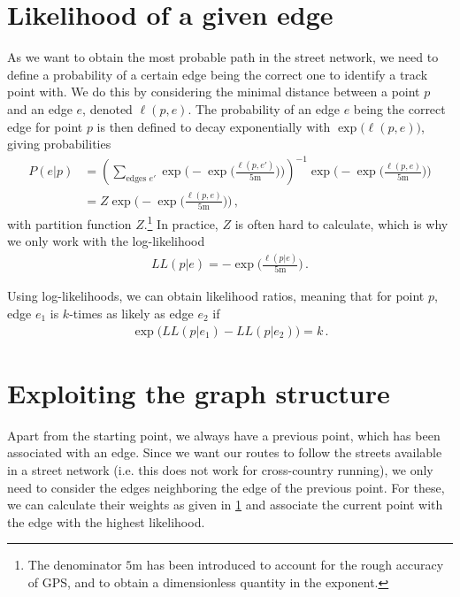 \documentclass[notitlepage]{scrarticle}
\begin{document}
\section{Likelihood of a given edge}\label{sec:likelihood_of_edge}
As we want to obtain the most probable path in the street network, we need to define a probability of a certain edge being the correct one to identify a track point with.
We do this by considering the minimal distance between a point $p$ and an edge $e$, denoted $\ell(p,e)$.
The probability of an edge $e$ being the correct edge for point $p$ is then defined to decay exponentially with $\exp\big(\ell(p,e)\big)$, giving probabilities
%
\begin{align*}
	P(e|p) & = \left(\sum_{\text{edges }e'}\exp\Big(-\exp\big(\frac{\ell(p,e')}{5\unit{\metre}}\big)\Big)\right)^{-1}\exp\Big(-\exp\big(\frac{\ell(p,e)}{5\unit{\metre}}\big)\Big) \\
	       & = Z\exp\Big(-\exp\big(\frac{\ell(p,e)}{5\unit{\metre}}\big)\Big)\,,
\end{align*}
with partition function $Z$.\footnote{The denominator $5\unit{\metre}$ has been introduced to account for the rough accuracy of GPS, and to obtain a dimensionless quantity in the exponent.}
In practice, $Z$ is often hard to calculate, which is why we only work with the log-likelihood
%
\begin{align*}
	LL(p|e) = -\exp\big(\frac{\ell(p|e)}{5\unit{\metre}}\big)\,.
\end{align*}

Using log-likelihoods, we can obtain likelihood ratios, meaning that for point $p$, edge $e_1$ is $k$-times as likely as edge $e_2$ if
%
\begin{align*}
	\exp\big(LL(p|e_1)-LL(p|e_2)\big)=k\,.
\end{align*}

\section{Exploiting the graph structure}
Apart from the starting point, we always have a previous point, which has been associated with an edge.
Since we want our routes to follow the streets available in a street network (i.e. this does not work for cross-country running), we only need to consider the edges neighboring the edge of the previous point.
For these, we can calculate their weights as given in \cref{sec:likelihood_of_edge} and associate the current point with the edge with the highest likelihood.
\end{document}
